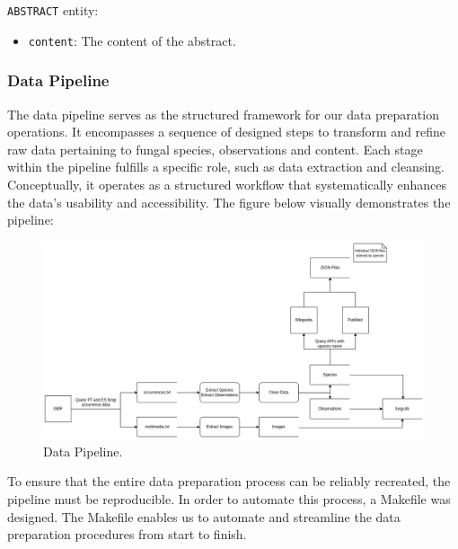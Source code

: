 \texttt{ABSTRACT} entity:
\begin{itemize}
    \item \texttt{content}: The content of the abstract.
\end{itemize}

\subsubsection{\textbf{Data Pipeline}}

The data pipeline serves as the structured framework for our data preparation operations. It encompasses a sequence of designed steps to transform and refine raw data pertaining to fungal species, observations and content. Each stage within the pipeline fulfills a specific role, such as data extraction and cleansing. Conceptually, it operates as a structured workflow that systematically enhances the data's usability and accessibility. The figure below visually demonstrates the pipeline:

\begin{figure}[h]
  \centering
  \includegraphics[width=\linewidth]{figures/data-flow-diagram.png}
  \caption{Data Pipeline.}
\end{figure}

To ensure that the entire data preparation process can be reliably recreated, the pipeline must be reproducible. In order to automate this process, a Makefile was designed. The Makefile enables us to automate and streamline the data preparation procedures from start to finish. 